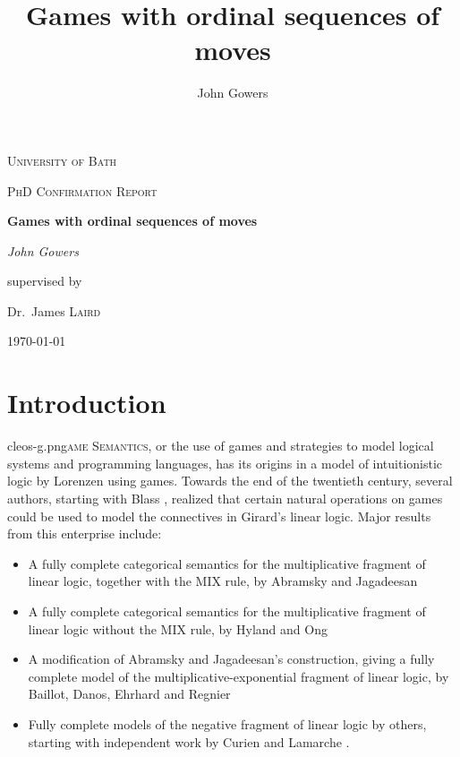 \documentclass[11pt]{article} %
\title{Games with ordinal sequences of moves}
\author{John Gowers}
\date{}
\begin{document}
\begin{titlepage} %
	\centering
	{\scshape\LARGE University of Bath \par}
	\vspace{1cm}
	{\scshape\Large PhD Confirmation Report \par}
	\vspace{1.5cm}
	{\huge\bfseries Games with ordinal sequences of moves \par}
	\vspace{2cm}
	{\Large\itshape John Gowers \par}
	\vfill
	supervised by\par
	Dr.~James \textsc{Laird}

	\vfill

	{\large \today\par}
\end{titlepage}

\tableofcontents
\thispagestyle{empty}

\setcounter{tocdepth}{2}

\section{Introduction}

\lettrine[image=true, lines=6, findent=3pt, nindent=0pt]{cleos-g.png}{ame Semantics}, or the use of games and strategies to model logical systems and programming languages, has its origins in a model of intuitionistic logic by Lorenzen \cite{lorenzengames} using games.  Towards the end of the twentieth century, several authors, starting with Blass \cite{blassgames}, realized that certain natural operations on games could be used to model the connectives in Girard's linear logic.  Major results from this enterprise include:
\begin{itemize}
  \item A fully complete categorical semantics for the multiplicative fragment of linear logic, together with the MIX rule, by Abramsky and Jagadeesan \cite{abramskyjagadeesangames}
  \item A fully complete categorical semantics for the multiplicative fragment of linear logic without the MIX rule, by Hyland and Ong \cite{HylandOngGames}
  \item A modification of Abramsky and Jagadeesan's construction, giving a fully complete model of the multiplicative-exponential fragment of linear logic, by Baillot, Danos, Ehrhard and Regnier \cite{bion}
  \item Fully complete models of the negative fragment of linear logic by others, starting with independent work by Curien \cite{curiengames} and Lamarche \cite{lamarchegames}.  
\end{itemize}
\end{document}
